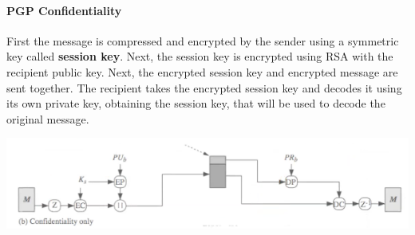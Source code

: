 \paragraph{PGP Confidentiality} First the message is compressed and encrypted by the sender using a symmetric key called \textbf{session key}. Next, the session key is encrypted using RSA with the recipient public key. Next, the encrypted session key and encrypted message are sent together. The recipient takes the encrypted session key and decodes it using its own private key, obtaining the session key, that will be used to decode the original message.
\begin{center}
\includegraphics[scale=0.5]{./images/pgp_confidentiality.png}
\end{center}
